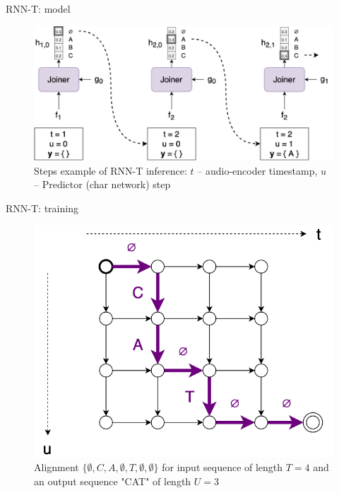 \begin{frame}{RNN-T: model}
    \begin{figure}
    	\centering
    	\includegraphics[width=0.99\linewidth]{figs/rnnt_step.png}
    	\caption{Steps example of RNN-T inference: $t$ -- audio-encoder timestamp, $u$ -- Predictor (char network) step}
    \end{figure}
    

\end{frame}
\begin{frame}{RNN-T: training}
    \begin{figure}
    	\centering
    	\includegraphics[width=0.8\linewidth]{figs/rnnt_training.png}
    	\caption{Alignment $\{\emptyset, C, A, \emptyset, T, \emptyset, \emptyset\}$ for input sequence of length $T=4$ and an output sequence "CAT" of length $U=3$}
    \end{figure}
    
\end{frame}

